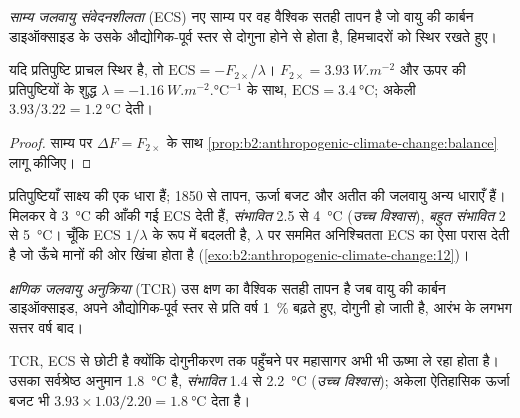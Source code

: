 \begin{definition}\label{def:b2:anthropogenic-climate-change:ecs}
\emph{साम्य जलवायु संवेदनशीलता} (ECS) नए साम्य पर वह वैश्विक
सतही तापन है जो वायु की कार्बन डाइऑक्साइड के उसके औद्योगिक-पूर्व स्तर से दोगुना होने से होता है,
हिमचादरों को स्थिर रखते हुए।
\end{definition}

\begin{proposition}[संवेदनशीलता और प्रतिपुष्टि]\label{prop:b2:anthropogenic-climate-change:ecs}
यदि प्रतिपुष्टि प्राचल स्थिर है, तो $\text{ECS} = -F_{2\times}/\lambda$। $F_{2\times} =
\qty{3.93}{W.m^{-2}}$ और ऊपर की प्रतिपुष्टियों के शुद्ध $\lambda = \qty{-1.16}{W.m^{-2}.\celsius^{-1}}$
के साथ, $\text{ECS} = \qty{3.4}{\celsius}$; अकेली  $3.93/3.22 =
\qty{1.2}{\celsius}$ देती।
\end{proposition}
\begin{proof}
साम्य पर $\Delta F =
F_{2\times}$ के साथ \cref{prop:b2:anthropogenic-climate-change:balance} लागू कीजिए।
\end{proof}

प्रतिपुष्टियाँ साक्ष्य की एक धारा हैं; 1850 से तापन, ऊर्जा बजट और अतीत की जलवायु
अन्य धाराएँ हैं। मिलकर वे \qty{3}{\celsius} की आँकी गई ECS देती हैं, \emph{संभावित}
2.5 से \qty{4}{\celsius} (\emph{उच्च विश्वास}), \emph{बहुत संभावित} 2 से \qty{5}{\celsius}।
चूँकि ECS $1/\lambda$ के रूप में बदलती है, $\lambda$ पर सममित अनिश्चितता ECS का ऐसा परास देती है जो
ऊँचे मानों की ओर खिंचा होता है (\cref{exo:b2:anthropogenic-climate-change:12})।

\begin{definition}[क्षणिक जलवायु अनुक्रिया]\label{def:b2:anthropogenic-climate-change:tcr}
\emph{क्षणिक जलवायु अनुक्रिया} (TCR) उस क्षण का वैश्विक सतही
तापन है जब वायु की कार्बन डाइऑक्साइड, अपने औद्योगिक-पूर्व स्तर से प्रति वर्ष \qty{1}{\percent} बढ़ते हुए,
दोगुनी हो जाती है, आरंभ के लगभग सत्तर वर्ष बाद।
\end{definition}

TCR, ECS से छोटी है क्योंकि दोगुनीकरण तक पहुँचने पर महासागर अभी भी ऊष्मा ले रहा होता है।
उसका सर्वश्रेष्ठ अनुमान \qty{1.8}{\celsius} है, \emph{संभावित} 1.4 से \qty{2.2}{\celsius}
(\emph{उच्च विश्वास}); अकेला ऐतिहासिक ऊर्जा बजट भी $3.93 \times 1.03/2.20 =
\qty{1.8}{\celsius}$ देता है।

